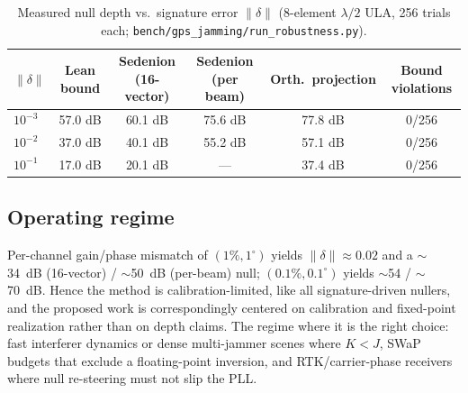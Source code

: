 \documentclass[12pt,letterpaper]{article}
\begin{document}
\begin{table}[h!]
\centering\small
\caption{Measured null depth vs.\ signature error $\|\delta\|$ (8-element $\lambda/2$ ULA, 256 trials each; \texttt{bench/gps\_jamming/run\_robustness.py}).}
\vspace{2pt}
\begin{tabular}{@{}lccccc@{}}
\toprule
$\|\delta\|$ & Lean bound & Sedenion (16-vector) & Sedenion (per beam) & Orth.\ projection & Bound violations \\
\midrule
$10^{-3}$ & 57.0 dB & 60.1 dB & 75.6 dB & 77.8 dB & 0/256 \\
$10^{-2}$ & 37.0 dB & 40.1 dB & 55.2 dB & 57.1 dB & 0/256 \\
$10^{-1}$ & 17.0 dB & 20.1 dB & --- & 37.4 dB & 0/256 \\
\bottomrule
\end{tabular}
\end{table}

\subsection{Operating regime}
Per-channel gain/phase mismatch of $(1\%,1^\circ)$ yields $\|\delta\|\approx0.02$ and a $\sim$34~dB (16-vector) / $\sim$50~dB (per-beam) null; $(0.1\%,0.1^\circ)$ yields $\sim$54 / $\sim$70~dB. Hence the method is calibration-limited, like all signature-driven nullers, and the proposed work is correspondingly centered on calibration and fixed-point realization rather than on depth claims. The regime where it is the right choice: fast interferer dynamics or dense multi-jammer scenes where $K<J$, SWaP budgets that exclude a floating-point inversion, and RTK/carrier-phase receivers where null re-steering must not slip the PLL.
\end{document}
